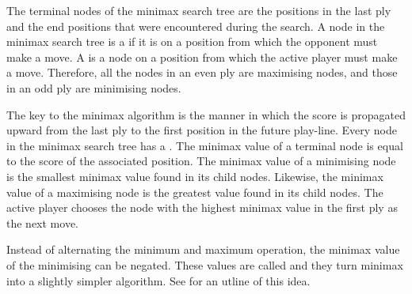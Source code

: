 The terminal nodes of the minimax search tree are the positions in the last ply and the end positions that were encountered during the search. A node in the minimax search tree is a  if it is on a position from which the opponent must make a move.  A  is a node on a position from which the active player must make a move.  Therefore, all the nodes in an even ply are maximising nodes, and those in an odd ply are minimising nodes.    

The key to the minimax algorithm is the manner in which the score is propagated upward from the last ply to the first position in the future play-line. Every node in the minimax search tree has a . The minimax value of a terminal node is equal to the score of the associated position.  The minimax value of a minimising node is the smallest minimax value found in its child nodes.  Likewise, the minimax value of a maximising node is the greatest value found in its child nodes.  The active player chooses the node with the highest minimax value in the first ply as the next move.  

Instead of alternating the minimum and maximum operation, the minimax value of the minimising can be negated. These values are called  \cite{furnkranz:survey} and they turn minimax into a slightly simpler algorithm. See  for an utline of this idea.

